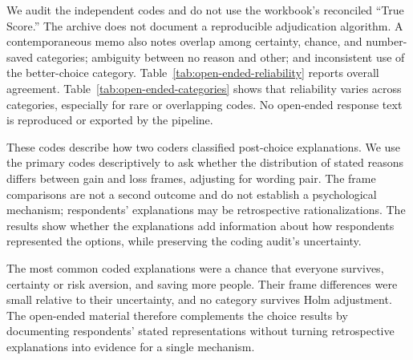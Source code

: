 \documentclass[11pt]{article}
\begin{document}
We audit the independent codes and do not use the workbook's reconciled ``True Score.'' The archive does not document a reproducible adjudication algorithm. A contemporaneous memo also notes overlap among certainty, chance, and number-saved categories; ambiguity between no reason and other; and inconsistent use of the better-choice category. Table~\ref{tab:open-ended-reliability} reports overall agreement. Table~\ref{tab:open-ended-categories} shows that reliability varies across categories, especially for rare or overlapping codes. No open-ended response text is reproduced or exported by the pipeline.





These codes describe how two coders classified post-choice explanations. We use the primary codes descriptively to ask whether the distribution of stated reasons differs between gain and loss frames, adjusting for wording pair. The frame comparisons are not a second outcome and do not establish a psychological mechanism; respondents' explanations may be retrospective rationalizations. The results show whether the explanations add information about how respondents represented the options, while preserving the coding audit's uncertainty.



The most common coded explanations were a chance that everyone survives, certainty or risk aversion, and saving more people. Their frame differences were small relative to their uncertainty, and no category survives Holm adjustment. The open-ended material therefore complements the choice results by documenting respondents' stated representations without turning retrospective explanations into evidence for a single mechanism.
\end{document}
